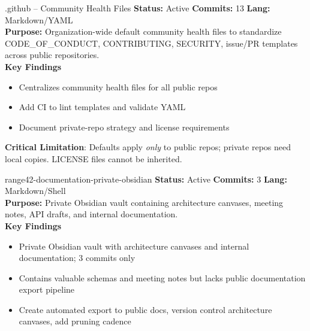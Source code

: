 \documentclass[aspectratio=169]{beamer}
\begin{document}
\begin{frame}{.github – Community Health Files \; \faUsers}
  \textbf{Status:} Active \hfill \textbf{Commits:} 13 \hfill \textbf{Lang:} Markdown/YAML\\[2mm]
  \textbf{Purpose:} Organization-wide default community health files to standardize CODE\_OF\_CONDUCT, CONTRIBUTING, SECURITY, issue/PR templates across public repositories.\\[2mm]
  \textbf{Key Findings}
  \begin{itemize}
    \item Centralizes community health files for all public repos
    \item Add CI to lint templates and validate YAML
    \item Document private-repo strategy and license requirements
  \end{itemize}
  \begin{tcolorbox}
    \faExclamationTriangle\; \textbf{Critical Limitation}: Defaults apply \emph{only} to public repos; private repos need local copies. LICENSE files cannot be inherited.
  \end{tcolorbox}
\end{frame}

\begin{frame}{range42-documentation-private-obsidian \; \faBook}
  \textbf{Status:} Active \hfill \textbf{Commits:} 3 \hfill \textbf{Lang:} Markdown/Shell\\[2mm]
  \textbf{Purpose:} Private Obsidian vault containing architecture canvases, meeting notes, API drafts, and internal documentation.\\[2mm]
  \textbf{Key Findings}
  \begin{itemize}
    \item Private Obsidian vault with architecture canvases and internal documentation; 3 commits only
    \item Contains valuable schemas and meeting notes but lacks public documentation export pipeline
    \item Create automated export to public docs, version control architecture canvases, add pruning cadence
  \end{itemize}
\end{frame}
\end{document}
